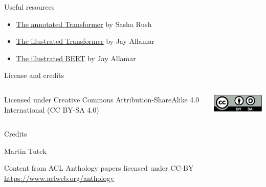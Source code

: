 \documentclass[12pt,aspectratio=169,handout]{beamer}
\begin{document}
\begin{frame}{Useful resources}
	
	\begin{itemize}
		\item \href{https://nlp.seas.harvard.edu/2018/04/03/attention.html}{\underline{The annotated Transformer}} by Sasha Rush
		\item \href{http://jalammar.github.io/illustrated-transformer/}{\underline{The illustrated Transformer}} by Jay Allamar
		\item \href{http://jalammar.github.io/illustrated-bert/}{\underline{The illustrated BERT}} by Jay Allamar
	\end{itemize}
		
	\end{frame}
	


\begin{frame}{License and credits}

	\begin{columns}
		\begin{column}{0.7\textwidth}
			Licensed under Creative Commons Attribution-ShareAlike 4.0 International (CC BY-SA 4.0)
		\end{column}
		\begin{column}{0.2\textwidth}
			\includegraphics[width=0.9\linewidth]{img/cc-by-sa-icon.pdf}
		\end{column}
	\end{columns}
	
	\bigskip
	
	Credits
	
	\begin{scriptsize}
		
		Martin Tutek
		
		Content from ACL Anthology papers licensed under CC-BY \url{https://www.aclweb.org/anthology}
		
	
	\end{scriptsize}
	
\end{frame}
\end{document}
